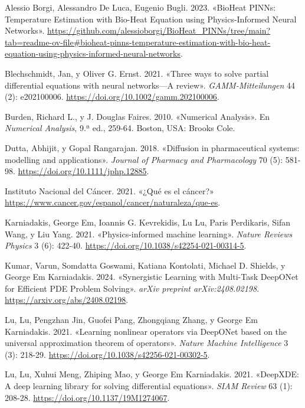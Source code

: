 \documentclass[
  spanish,
  us-letterpaper,
  DIV=11,
  numbers=noendperiod]{scrreprt}
\newlength{\cslhangindent}
\newenvironment{CSLReferences}[2] %
 {\begin{list}{}{%
  \setlength{\itemindent}{0pt}
  \setlength{\leftmargin}{0pt}
  \setlength{\parsep}{0pt}
  \ifodd #1
   \setlength{\leftmargin}{\cslhangindent}
   \setlength{\itemindent}{-1\cslhangindent}
  \fi
  \setlength{\itemsep}{#2\baselineskip}}}
 {\end{list}}
\theoremstyle{definition}
\theoremstyle{plain}
\theoremstyle{remark}
\begin{document}
\label{refs}
\begin{CSLReferences}{1}{0}
Alessio Borgi, Alessandro De Luca, Eugenio Bugli. 2023. {«{BioHeat
PINNs: Temperature Estimation with Bio-Heat Equation using
Physics-Informed Neural Networks}»}.
\url{https://github.com/alessioborgi/BioHeat_PINNs/tree/main?tab=readme-ov-file\#bioheat-pinns-temperature-estimation-with-bio-heat-equation-using-physics-informed-neural-networks}.

Blechschmidt, Jan, y Oliver G. Ernst. 2021. {«Three ways to solve
partial differential equations with neural networks---A review»}.
\emph{GAMM-Mitteilungen} 44 (2): e202100006.
\url{https://doi.org/10.1002/gamm.202100006}.

Burden, Richard L., y J. Douglas Faires. 2010. {«Numerical Analysis»}.
En \emph{Numerical Analysis}, 9.ª ed., 259-64. Boston, USA: Brooks Cole.

Dutta, Abhijit, y Gopal Rangarajan. 2018. {«Diffusion in pharmaceutical
systems: modelling and applications»}. \emph{Journal of Pharmacy and
Pharmacology} 70 (5): 581-98. \url{https://doi.org/10.1111/jphp.12885}.

Instituto Nacional del Cáncer. 2021. {«{¿Qué es el cáncer?}»}
\url{https://www.cancer.gov/espanol/cancer/naturaleza/que-es}.

Karniadakis, George Em, Ioannis G. Kevrekidis, Lu Lu, Paris Perdikaris,
Sifan Wang, y Liu Yang. 2021. {«Physics-informed machine learning»}.
\emph{Nature Reviews Physics} 3 (6): 422-40.
\url{https://doi.org/10.1038/s42254-021-00314-5}.

Kumar, Varun, Somdatta Goswami, Katiana Kontolati, Michael D. Shields, y
George Em Karniadakis. 2024. {«Synergistic Learning with Multi-Task
DeepONet for Efficient PDE Problem Solving»}. \emph{arXiv preprint
arXiv:2408.02198}. \url{https://arxiv.org/abs/2408.02198}.

Lu, Lu, Pengzhan Jin, Guofei Pang, Zhongqiang Zhang, y George Em
Karniadakis. 2021. {«Learning nonlinear operators via DeepONet based on
the universal approximation theorem of operators»}. \emph{Nature Machine
Intelligence} 3 (3): 218-29.
\url{https://doi.org/10.1038/s42256-021-00302-5}.

Lu, Lu, Xuhui Meng, Zhiping Mao, y George Em Karniadakis. 2021.
{«{DeepXDE}: A deep learning library for solving differential
equations»}. \emph{SIAM Review} 63 (1): 208-28.
\url{https://doi.org/10.1137/19M1274067}.


\end{CSLReferences}
\end{document}
